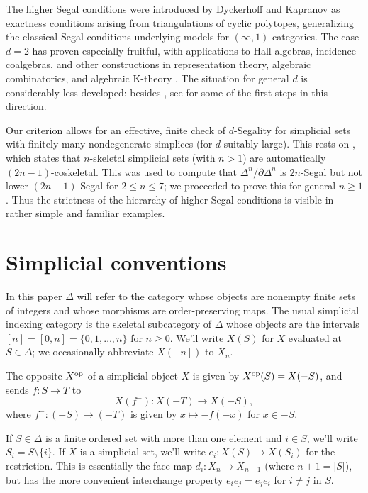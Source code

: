 \documentclass{amsart}
\newcommand{\op}{\textup{op}}
\theoremstyle{definition}
\theoremstyle{remark}
\begin{document}
The higher Segal conditions were introduced by Dyckerhoff and Kapranov \cite{Dyckerhoff:CPOC,DyckerhoffKapranov:HSS} as exactness conditions arising from triangulations of cyclic polytopes, generalizing the classical Segal conditions underlying models for $(\infty,1)$-categories.
The case $d=2$ has proven especially fruitful, with applications to Hall algebras, incidence coalgebras, and other constructions in representation theory, algebraic combinatorics, and algebraic K-theory \cite{Dyckerhoff:HCAHA,GKT:DSC}. 
The situation for general $d$ is considerably less developed: besides \cite{Dyckerhoff:CPOC,Poguntke:HSSAKT}, see \cite{DyckerhoffJassoWalde:SSHART,HackneyLynd:HSSPG,Walde:HSSHE} for some of the first steps in this direction.

Our criterion allows for an effective, finite check of $d$-Segality for simplicial sets with finitely many nondegenerate simplices (for $d$ suitably large).
This rests on \cite[Theorem 3.19]{KRRZ:LTSS}, which states that $n$-skeletal simplicial sets (with $n > 1$) are automatically $(2n{-}1)$-coskeletal.
This was used to compute that $\Delta^n/\partial \Delta^n$ is $2n$-Segal but not lower $(2n{-}1)$-Segal for $2 \leq n \leq 7$; we proceeded to prove this for general $n \geq 1$ \cite{Hackney:SdSS}. 
Thus the strictness of the hierarchy of higher Segal conditions is visible in rather simple and familiar examples.

\section{Simplicial conventions}
In this paper $\Delta$ will refer to the category whose objects are nonempty finite sets of integers and whose morphisms are order-preserving maps.
The usual simplicial indexing category is the skeletal subcategory of $\Delta$ whose objects are the intervals $[n] = [0,n] = \{0, 1, \dots, n\}$ for $n\geq 0$.
We'll write $X(S)$ for $X$ evaluated at $S\in \Delta$; we occasionally abbreviate $X([n])$ to $X_n$.

The opposite $X^\op$ of a simplicial object $X$ is given by $X^\op(S) = X(-S)$, and sends $f\colon S \to T$ to
\[
	X(f^-) \colon X(-T) \to X(-S),
\]
where $f^- \colon (-S) \to (-T)$ is given by $x\mapsto -f(-x)$ for $x\in -S$.

If $S\in \Delta$ is a finite ordered set with more than one element and $i\in S$, we'll write $S_i = S\setminus \{i\}$. 
If $X$ is a simplicial set, we'll write $e_i \colon X(S) \to X(S_i)$ for the restriction.
This is essentially the face map $d_i \colon X_n \to X_{n-1}$ (where $n+1 = |S|$), but has the more convenient interchange property $e_i e_j = e_j e_i$ for $i\neq j$ in $S$.
\end{document}
